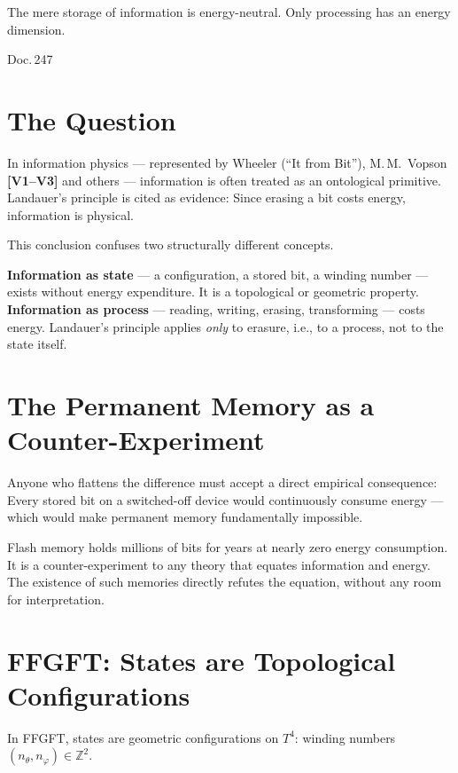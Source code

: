 \label{ch:zustand_prozess}

\epigraph{The mere storage of information is energy-neutral.
Only processing has an energy dimension.}{Doc.\,247}

\section{The Question}

In information physics --- represented by Wheeler (\enquote{It from Bit}),
M.\,M.~Vopson \textbf{[V1--V3]} and others --- information is often treated as an ontological
primitive. Landauer's principle is cited as evidence: Since
erasing a bit costs energy, information is physical.

This conclusion confuses two structurally different concepts.

\begin{keyresult}
\textbf{Information as state} --- a configuration, a stored
bit, a winding number --- exists without energy expenditure. It is a
topological or geometric property.\\[4pt]
\textbf{Information as process} --- reading, writing, erasing, transforming
--- costs energy. Landauer's principle applies \emph{only} to erasure,
i.e., to a process, not to the state itself.
\end{keyresult}

\section{The Permanent Memory as a Counter-Experiment}

Anyone who flattens the difference must accept a direct empirical consequence:
Every stored bit on a switched-off device would
continuously consume energy --- which would make permanent memory fundamentally
impossible.

Flash memory holds millions of bits for years at nearly zero energy consumption.
It is a counter-experiment to any theory that equates information and energy.
The existence of such memories directly refutes the equation,
without any room for interpretation.

\section{FFGFT: States are Topological Configurations}

In FFGFT, states are geometric configurations on $T^4$:
winding numbers $(n_\theta, n_\varphi) \in \mathbb{Z}^2$.

